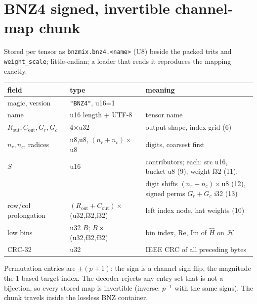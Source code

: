 \documentclass[11pt]{article}
\begin{document}
\section{BNZ4 signed, invertible channel-map chunk}\label{sec:bnz4}
Stored per tensor as \texttt{bnzmix.bnz4.<name>} (U8) beside the packed trits and \texttt{weight\_scale}; little-endian; a loader that reads it reproduces the mapping exactly.
\begin{center}\footnotesize\begin{tabular}{lll}\toprule
field&type&meaning\\\midrule
magic, version&\texttt{"BNZ4"}, u16=1&\\
name&u16 length + UTF-8&tensor name\\
$R_{\mathrm{out}},C_{\mathrm{out}},G_r,G_c$&4$\times$u32&output shape, index grid (6)\\
$n_r,n_c$, radices&u8,u8, $(n_r{+}n_c)\times$u8&digits, coarsest first\\
$S$&u16&contributors; each: src u16, bucket u8 (9), weight f32 (11),\\
&&\quad digit shifts $(n_r{+}n_c)\times$u8 (12), signed perms $G_r{+}G_c$ i32 (13)\\
row/col prolongation&$(R_{\mathrm{out}}{+}C_{\mathrm{out}})\times$(u32,f32,f32)&left index node, hat weights (10)\\
low bins&u32 $B$; $B\times$(u32,f32,f32)&bin index, Re, Im of $\widehat H$ on $\mathcal H$\\
CRC-32&u32&IEEE CRC of all preceding bytes\\\bottomrule\end{tabular}\end{center}
Permutation entries are $\pm(p+1)$: the sign is a channel sign flip, the magnitude the 1-based target index. The decoder rejects any entry set that is not a bijection, so every stored map is invertible (inverse: $p^{-1}$ with the same signs). The chunk travels inside the lossless BNZ container.
\end{document}
